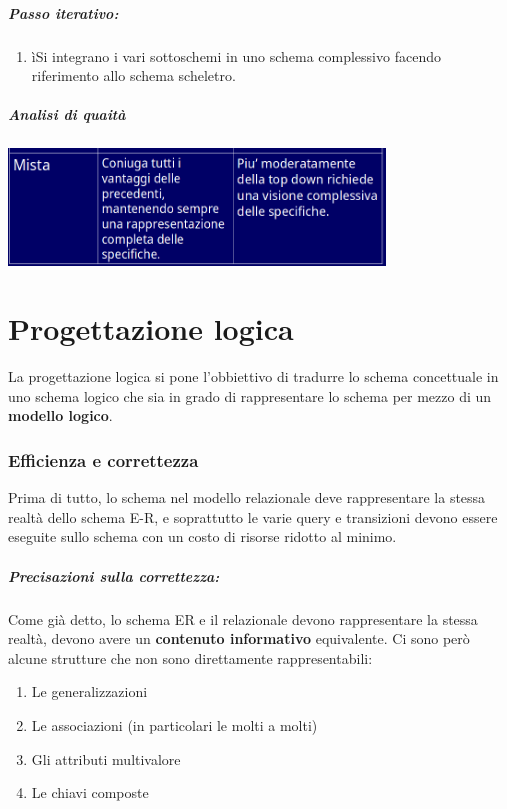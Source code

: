 \documentclass[12pt, a4paper, openany, twoside]{book}
\begin{document}
\paragraph{Passo iterativo:} 
\begin{enumerate}
	\item ìSi integrano i vari sottoschemi in uno schema complessivo facendo 
	riferimento allo schema scheletro.
\end{enumerate}
\paragraph{Analisi di quaità}
\begin{center}
\includegraphics[width=0.75\textwidth]{10}
\end{center}
\chapter{Progettazione logica}
La progettazione logica si pone l'obbiettivo di tradurre lo schema concettuale
in uno schema logico che sia in grado di rappresentare lo schema per mezzo
di un \textbf{modello logico}. 
\subsection{Efficienza e correttezza}
Prima di tutto, lo schema nel modello relazionale deve rappresentare la
stessa realtà dello schema E-R, e soprattutto le varie query e transizioni
devono essere eseguite sullo schema con un costo di risorse ridotto al minimo.
\paragraph{Precisazioni sulla correttezza:}
Come già detto, lo schema ER e il relazionale devono rappresentare la stessa
realtà, devono avere un \textbf{contenuto informativo} equivalente. Ci sono però
alcune strutture che non sono direttamente rappresentabili:
\begin{enumerate}
	\item Le generalizzazioni
	\item Le associazioni (in particolari le molti a molti)
	\item Gli attributi multivalore
	\item Le chiavi composte
\end{enumerate}
\end{document}
